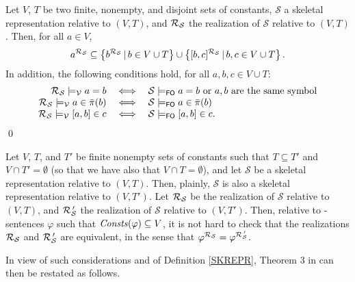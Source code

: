 \documentclass[a4paper]{llncs}
\newcommand{\pair}[2]{[#1,#2]}
\newcommand{\nonpairssym}{\bar{\pi}}
\newcommand{\nonpairs}[1]{\nonpairssym(#1)}
\newcommand{\pairin}[3]{\left[#1,#2\right] \in #3}
\newcommand{\nonpairin}[2]{#1 \in \bar{\pi}(#2)}
\newcommand{\seteq}[2]{#1=#2}
\newcommand{\atset}{\mathcal{S}}
\newcommand{\consta}{a}
\newcommand{\constb}{b}
\newcommand{\constc}{c}
\newcommand{\red}[1]{\textcolor{red}{#1}}
\newcommand{\fomodels}[2]{#1 \models_{\mathsf{FO}} #2}
\newcommand{\vmodels}[2]{#1 \models_{\mathcal{V}} #2}
\begin{document}
\begin{lemma}\label{REALIZATION}
Let $V$, $T$ be two finite, nonempty, and disjoint sets of constants, 
$\atset$ a
skeletal representation relative to $(V,T)$, and $\Realization_{\!\atset}$
the realization of $\atset$ relative to $(V,T)$. Then, for all $\consta \in V$,
\[
\consta^{\Realization_{\!\atset}} \subseteq \left\{ 
\constb^{\Realization_{\!\atset}} \,|\, \constb \in V \cup T \right\} 
\cup
  \left\{ [\constb, \constc]^{\Realization_{\!\atset}} \,|\, \constb, 
\constc \in V \cup T \right\} .
\]
In addition, the following conditions hold,
for all $\consta, \constb, \constc \in V \cup T$:
\[
\begin{array}{rcl}
   \vmodels{\Realization_{\!\atset}}{\consta = \constb}& \iff  & \fomodels{\atset}{\seteq{\consta}{\constb}} 
\mbox{ or }\consta, \constb\mbox{ are the same symbol}\\
   \vmodels{\Realization_{\!\atset}}{\consta \in \nonpairs{\constb}} & 
\iff & \fomodels{\atset}{\nonpairin{\consta}{\constb}}\\
   \vmodels{\Realization_{\!\atset}}{\pair{\consta}{\constb} \in 
\constc} & \iff & 
\fomodels{\atset}{\pairin{\consta}{\constb}{\constc}} .
\end{array}
\]
\qed
\end{lemma}
%

Let $V$, $T$, and $T'$ be finite nonempty sets of constants such that 
$T \subseteq T'$ and $V \cap T' = \emptyset$ (so that we have also 
that $V \cap T = \emptyset$), and let $\atset$ be a skeletal 
representation relative to $(V,T)$. Then, plainly, $\atset$ is also a 
skeletal representation relative to $(V,T')$. Let 
$\Realization_{\!\atset}$ be the realization of $\atset$  relative to 
$(V,T)$, and $\Realization'_{\!\atset}$ the realization of $\atset$ 
relative to $(V,T')$. Then, relative to \Forallpizero-sentences 
$\varphi$ such that $\mathit{Consts}(\varphi) \subseteq V$, it is not hard to 
check that the realizations $\Realization_{\!\atset}$ and 
$\Realization'_{\!\atset}$ are equivalent, in the sense that 
$\varphi^{\Realization_{\!\atset}} = 
\varphi^{\Realization'_{\!\atset}}$.

In view of such considerations and of Definition \ref{SKREPR}, 
Theorem 3 in \cite{CanLonNic2011} can then be restated as follows.
\end{document}
